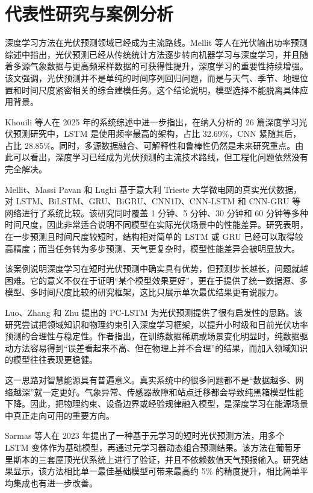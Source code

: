\section{代表性研究与案例分析}

深度学习方法在光伏预测领域已经成为主流路线。Mellit 等人在光伏输出功率预测综述中指出，光伏预测已经从传统统计方法逐步转向机器学习与深度学习，并且随着多源气象数据与更高频采样数据的可获得性提升，深度学习的重要性持续增强\cite{mellit2020}。该文强调，光伏预测并不是单纯的时间序列回归问题，而是与天气、季节、地理位置和时间尺度紧密相关的综合建模任务。这个结论说明，模型选择不能脱离具体应用背景。

Khouili 等人在 2025 年的系统综述中进一步指出，在纳入分析的 26 篇深度学习光伏预测研究中，LSTM 是使用频率最高的架构，占比 32.69\%，CNN 紧随其后，占比 28.85\%\cite{khouili2025}。同时，多源数据融合、可解释性和鲁棒性仍然是未来研究重点。由此可以看出，深度学习已经成为光伏预测的主流技术路线，但工程化问题依然没有完全解决。

Mellit、Massi Pavan 和 Lughi 基于意大利 Trieste 大学微电网的真实光伏数据，对 LSTM、BiLSTM、GRU、BiGRU、CNN1D、CNN-LSTM 和 CNN-GRU 等网络进行了系统比较\cite{mellit2021}。该研究同时覆盖 1 分钟、5 分钟、30 分钟和 60 分钟等多种时间尺度，因此非常适合说明不同模型在实际光伏场景中的性能差异。研究表明，在一步预测且时间尺度较短时，结构相对简单的 LSTM 或 GRU 已经可以取得较高精度；而当任务转为多步预测、天气更复杂时，模型性能差异会被明显放大。

该案例说明深度学习在短时光伏预测中确实具有优势，但预测步长越长，问题就越困难。它的意义不仅在于证明“某个模型效果更好”，更在于提供了统一数据源、多模型、多时间尺度比较的研究框架，这比只展示单次最优结果更有说服力。

Luo、Zhang 和 Zhu 提出的 PC-LSTM 为光伏预测提供了很有启发性的思路\cite{luo2021}。该研究尝试把领域知识和物理约束引入深度学习框架，以提升小时级和日前光伏功率预测的合理性与稳定性。作者指出，在训练数据稀疏或场景变化明显时，纯数据驱动方法容易得到“误差看起来不高、但在物理上并不合理”的结果，而加入领域知识的模型往往表现更稳健。

这一思路对智慧能源具有普遍意义。真实系统中的很多问题都不是“数据越多、网络越深”就一定更好。气象异常、传感器故障和站点迁移都会导致纯黑箱模型性能下降。因此，把物理约束、设备边界或经验规律融入模型，是深度学习在能源场景中真正走向可用的重要方向。

Sarmas 等人在 2023 年提出了一种基于元学习的短时光伏预测方法，用多个 LSTM 变体作为基础模型，再通过元学习器动态组合预测结果\cite{sarmas2023}。该方法在葡萄牙里斯本的三套屋顶光伏系统上进行了验证，并且不依赖数值天气预报输入。研究结果显示，该方法相比单一最佳基础模型可带来最高约 5\% 的精度提升，相比简单平均集成也有进一步改善。

